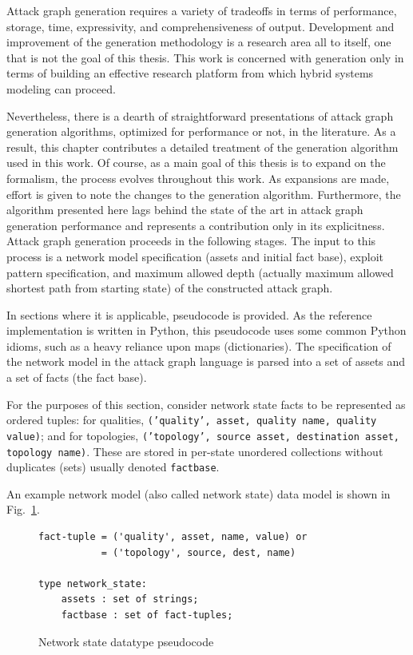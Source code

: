 Attack graph generation requires a variety of tradeoffs in terms of performance,
storage, time, expressivity, and comprehensiveness of output. Development and
improvement of the generation methodology is a research area all to itself, one
that is not the goal of this thesis. This work is concerned with generation only
in terms of building an effective research platform from which hybrid systems
modeling can proceed.

Nevertheless, there is a dearth of straightforward presentations of attack 
graph generation algorithms, optimized for performance or not, in the 
literature. As a result, this chapter contributes a detailed treatment of the
generation algorithm used in this work. Of course, as a main goal of this
thesis is to expand on the formalism, the process evolves throughout this
work. As expansions are made, effort is given to note the changes to the
generation algorithm. Furthermore, the algorithm presented here lags behind the
state of the art in attack graph generation performance and represents a
contribution only in its explicitness.
Attack graph generation proceeds in the following stages. The input to this
process is a network model specification (assets and initial fact base),
exploit pattern specification, and maximum allowed depth (actually maximum
allowed shortest path from starting state) of the constructed attack graph.

In sections where it is applicable, pseudocode is provided. As the reference
implementation is written in Python, this pseudocode uses some common Python
idioms, such as a heavy reliance upon maps (dictionaries).
The specification of the network model in the attack graph language is
parsed into a set of assets and a set of facts (the fact base). 

For the purposes
of this section, consider network state facts to be represented as ordered
tuples: for qualities, \texttt{('quality', asset, quality name, quality value)};
and for topologies, \texttt{('topology', source asset, destination asset,
topology name)}. These are stored in per-state unordered collections without duplicates
(sets) usually denoted \texttt{factbase}.

An example network model (also called network state) data model is shown in
Fig.~\ref{fig:netstate_pc}.

\begin{figure}
\begin{lstlisting}
fact-tuple = ('quality', asset, name, value) or
           = ('topology', source, dest, name)

type network_state:
    assets : set of strings;
    factbase : set of fact-tuples;
\end{lstlisting}
\caption{Network state datatype pseudocode}
\label{fig:netstate_pc}
\end{figure}


